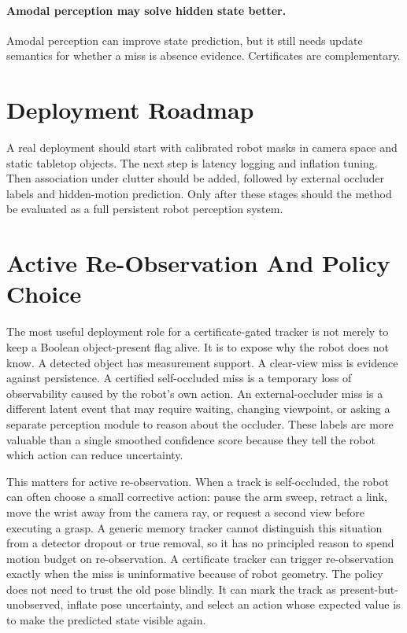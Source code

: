\documentclass{article}
\begin{document}
\paragraph{Amodal perception may solve hidden state better.}
Amodal perception can improve state prediction, but it still needs update
semantics for whether a miss is absence evidence. Certificates are complementary.

\section{Deployment Roadmap}

A real deployment should start with calibrated robot masks in camera space and
static tabletop objects. The next step is latency logging and inflation tuning.
Then association under clutter should be added, followed by external occluder
labels and hidden-motion prediction. Only after these stages should the method
be evaluated as a full persistent robot perception system.

\section{Active Re-Observation And Policy Choice}

The most useful deployment role for a certificate-gated tracker is not merely to
keep a Boolean object-present flag alive. It is to expose why the robot does not
know. A detected object has measurement support. A clear-view miss is evidence
against persistence. A certified self-occluded miss is a temporary loss of
observability caused by the robot's own action. An external-occluder miss is a
different latent event that may require waiting, changing viewpoint, or asking a
separate perception module to reason about the occluder. These labels are more
valuable than a single smoothed confidence score because they tell the robot
which action can reduce uncertainty.

This matters for active re-observation. When a track is self-occluded, the robot
can often choose a small corrective action: pause the arm sweep, retract a link,
move the wrist away from the camera ray, or request a second view before
executing a grasp. A generic memory tracker cannot distinguish this situation
from a detector dropout or true removal, so it has no principled reason to spend
motion budget on re-observation. A certificate tracker can trigger
re-observation exactly when the miss is uninformative because of robot geometry.
The policy does not need to trust the old pose blindly. It can mark the track as
present-but-unobserved, inflate pose uncertainty, and select an action whose
expected value is to make the predicted state visible again.
\end{document}
